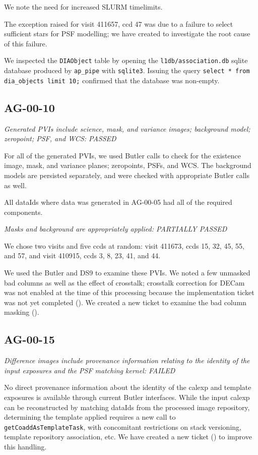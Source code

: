 \documentclass[DM,lsstdraft,STR,toc]{lsstdoc}
\begin{document}
We note the need for increased SLURM timelimits.

The exception raised for visit 411657, ccd 47 was due to a failure to select
sufficient stars for PSF modelling; we have created  to 
investigate the root cause of this failure.

We inspected the \texttt{DIAObject} table by opening the 
\texttt{l1db/association.db} sqlite database produced by \texttt{ap\_pipe} 
with \texttt{sqlite3}.  Issuing the query \texttt{select * from dia\_objects limit 10;} confirmed that the database was non-empty.


\subsection{AG-00-10}

\textit{Generated PVIs include science, mask, and variance images; background model; zeropoint; PSF, and WCS: PASSED}

For all of the generated PVIs, we used Butler calls to check for the existence
image, mask, and variance planes; zeropoints, PSFs, and WCS. The background models are persisted separately, and were checked with appropriate Butler calls as well.

All dataIds where data was generated in AG-00-05 had all of the required components.

\textit{Masks and background are appropriately applied: PARTIALLY PASSED}

We chose two visits and five ccds at random:
visit 411673, ccds 15, 32, 45, 55, and 57, and
visit 410915, ccds 3,  8, 23, 41, and 44.

We used the Butler and DS9 to examine these PVIs.  We noted a few unmasked 
bad columns as well as the effect of crosstalk; crosstalk correction for DECam
was not enabled at the time of this processing because the implementation 
ticket was not yet completed ().  We created a new ticket
to examine the bad column masking ().

\subsection{AG-00-15}

\textit{Difference images include provenance information relating to the 
identity of the input exposures and the PSF matching kernel:  FAILED}

No direct provenance information about the identity of the calexp and template
exposures is available through current Butler interfaces.  While the input
calexp can be reconstructed by matching dataIds from the processed image
repository, determining the template applied requires a new call to
\texttt{getCoaddAsTemplateTask}, with concomitant restrictions on 
stack versioning, template repository association, etc.
We have created a new ticket () to improve this handling.
\end{document}
